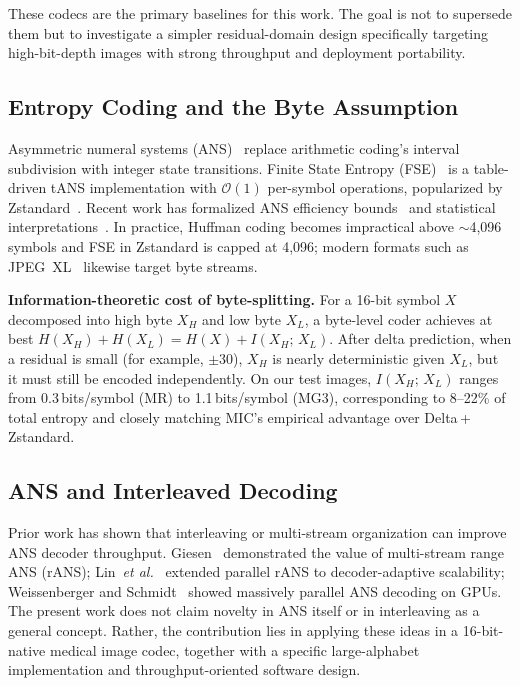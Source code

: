 \documentclass[journal]{IEEEtran}
\begin{document}
These codecs are the primary baselines for this work. The goal is not to
supersede them but to investigate a simpler residual-domain design specifically
targeting high-bit-depth images with strong throughput and deployment
portability.

\subsection{Entropy Coding and the Byte Assumption}

Asymmetric numeral systems (ANS)~\cite{duda2009,duda2013} replace arithmetic
coding's interval subdivision with integer state transitions. Finite State
Entropy (FSE)~\cite{fse} is a table-driven tANS implementation with
$\mathcal{O}(1)$ per-symbol operations, popularized by Zstandard~\cite{rfc8878}.
Recent work has formalized ANS efficiency bounds~\cite{kosolobov2022} and
statistical interpretations~\cite{bamler2022}. In practice, Huffman coding
becomes impractical above ${\sim}$4,096 symbols and FSE in Zstandard is capped
at 4,096; modern formats such as JPEG~XL~\cite{jpegxl} likewise target byte
streams.

\textbf{Information-theoretic cost of byte-splitting.} For a 16-bit symbol $X$
decomposed into high byte $X_H$ and low byte $X_L$, a byte-level coder
achieves at best $H(X_H)+H(X_L)=H(X)+I(X_H;\,X_L)$. After delta prediction,
when a residual is small (for example, $\pm 30$), $X_H$ is nearly deterministic
given $X_L$, but it must still be encoded independently. On our test images,
$I(X_H;\,X_L)$ ranges from 0.3\,bits/symbol (MR) to 1.1\,bits/symbol (MG3),
corresponding to 8--22\% of total entropy and closely matching MIC's empirical
advantage over Delta\,+\,Zstandard.

\subsection{ANS and Interleaved Decoding}

Prior work has shown that interleaving or multi-stream organization can improve
ANS decoder throughput. Giesen~\cite{giesen2014,giesen2014b} demonstrated the
value of multi-stream range ANS (rANS); Lin~\textit{et al.}~\cite{lin2023}
extended parallel rANS to decoder-adaptive scalability;
Weissenberger and Schmidt~\cite{weissenberger2019} showed massively parallel
ANS decoding on GPUs. The present work does not claim novelty in ANS itself or
in interleaving as a general concept. Rather, the contribution lies in applying
these ideas in a 16-bit-native medical image codec, together with a specific
large-alphabet implementation and throughput-oriented software design.
\end{document}

